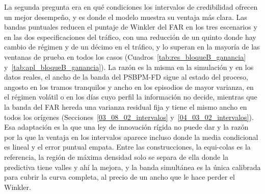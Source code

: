 La segunda pregunta era en qué condiciones los intervalos de credibilidad ofrecen un mejor desempeño, y es donde el modelo muestra su ventaja más clara. Las bandas puntuales reducen el puntaje de Winkler del FAR en los tres escenarios y en las dos especificaciones del tráfico, con una reducción de un quinto donde hay cambio de régimen y de un décimo en el tráfico, y lo superan en la mayoría de las ventanas de prueba en todos los casos (Cuadros~\ref{tab:res_bloqueB_ganancia} y~\ref{tab:apl_bloqueB_ganancia}). La razón es la misma en la simulación y en los datos reales, el ancho de la banda del PSBPM-FD sigue al estado del proceso, angosto en los tramos tranquilos y ancho en los episodios de mayor varianza, en el régimen volátil o en los días cuyo perfil la información no decide, mientras que la banda del FAR hereda una varianza residual fija y tiene el mismo ancho en todos los orígenes (Secciones~\ref{03_08_02_intervalos} y~\ref{04_03_02_intervalos}). Esa adaptación es la que una ley de innovación rígida no puede dar y la razón por la que la ventaja en los intervalos aparece incluso donde la media condicional es lineal y el error puntual empata. Entre las construcciones, la equi-colas es la referencia, la región de máxima densidad solo se separa de ella donde la predictiva tiene valles y ahí la mejora, y la banda simultánea es la única calibrada para cubrir la curva completa, al precio de un ancho que le hace perder el Winkler.\\


